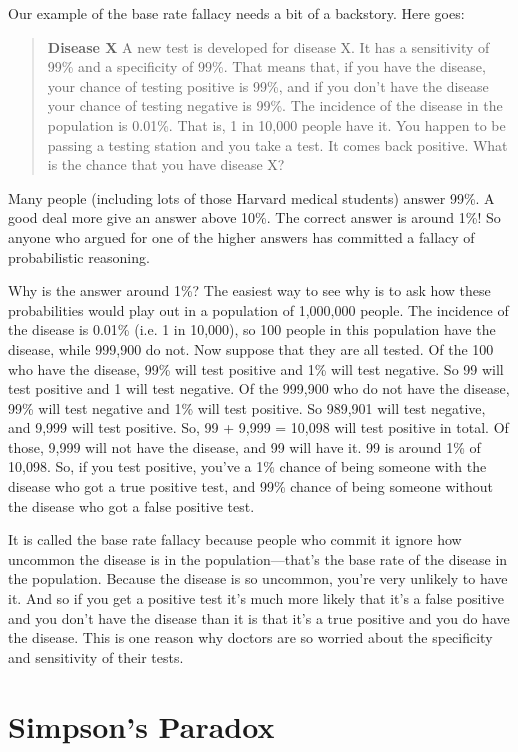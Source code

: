 Our example of the base rate fallacy needs a bit of a backstory. Here goes:
\begin{quote}
\textbf{Disease X } A new test is developed for disease X. It has a sensitivity of 99\% and a specificity of 99\%. That means that, if you have the disease, your chance of testing positive is 99\%, and if you don't have the disease your chance of testing negative is 99\%. The incidence of the disease in the population is 0.01\%. That is, 1 in 10,000 people have it. You happen to be passing a testing station and you take a test. It comes back positive. What is the chance that you have disease X? 
\end{quote}
Many people (including lots of those Harvard medical students) answer 99\%. A good deal more give an answer above 10\%. The correct answer is around 1\%! So anyone who argued for one of the higher answers has committed a fallacy of probabilistic reasoning.

Why is the answer around 1\%? The easiest way to see why is to ask how these probabilities would play out in a population of 1,000,000 people. The incidence of the disease is 0.01\% (i.e. 1 in 10,000), so 100 people in this population have the disease, while 999,900 do not. Now suppose that they are all tested. Of the 100 who have the disease, 99\% will test positive and 1\% will test negative. So 99 will test positive and 1 will test negative. Of the 999,900 who do not have the disease, 99\% will test negative and 1\% will test positive. So 989,901 will test negative, and 9,999 will test positive. So, 99 + 9,999 = 10,098 will test positive in total. Of those, 9,999 will not have the disease, and 99 will have it. 99 is around 1\% of 10,098. So, if you test positive, you've a 1\% chance of being someone with the disease who got a true positive test, and 99\% chance of being someone without the disease who got a false positive test. 

It is called the base rate fallacy because people who commit it ignore how uncommon the disease is in the population---that's the base rate of the disease in the population. Because the disease is so uncommon, you're very unlikely to have it. And so if you get a positive test it's much more likely that it's a false positive and you don't have the disease than it is that it's a true positive and you do have the disease. This is one reason why doctors are so worried about the specificity and sensitivity of their tests. 

\section{Simpson's Paradox}


